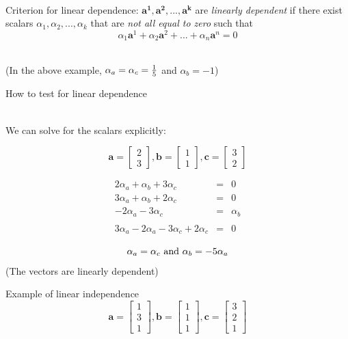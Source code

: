 \documentclass[10pt]{seminar}
\begin{document}
\begin{slide}
\ \\Criterion for linear dependence:  $\mathbf{a^1, a^2, ..., a^k}$ are \textit{linearly dependent} if there exist scalars $\alpha_1, \alpha_2, ..., \alpha_k$ that are \textit{not all equal to zero} such that $$\alpha_1 \mathbf{a}^1+\alpha_2 \mathbf{a}^2+...+\alpha_n \mathbf{a}^n=0$$

\ \\(In the above example, $\alpha_a=\alpha_c={1\over 5}$ and $\alpha_b=-1$)

\newslide
How to test for linear dependence

\ \\We can solve for the scalars explicitly:

$$
\mathbf{a}=
\begin{bmatrix}
2 \\ 3
\end{bmatrix},
\mathbf{b}=
\begin{bmatrix}
1 \\ 1
\end{bmatrix},
\mathbf{c}=
\begin{bmatrix}
3 \\ 2
\end{bmatrix}
$$

$$\begin{array}{rcl}
2\alpha_a+\alpha_b+3\alpha_c&=&0 \\
3\alpha_a+\alpha_b+2\alpha_c&=&0 
 \\
-2\alpha_a-3\alpha_c &=& \alpha_b\\
 \\
 3\alpha_a-2\alpha_a-3\alpha_c+2\alpha_c&=&0
\end{array}
$$

$$\alpha_a=\alpha_c \hbox{ and } \alpha_b=-5\alpha_a$$
(The vectors are linearly dependent)

\newslide
Example of linear independence
$$
\mathbf{a}=
\begin{bmatrix}
1 \\ 3 \\ 1
\end{bmatrix},
\mathbf{b}=
\begin{bmatrix}
1 \\ 1 \\1
\end{bmatrix},
\mathbf{c}=
\begin{bmatrix}
3 \\ 2 \\1
\end{bmatrix}
$$


\end{slide}
\end{document}
